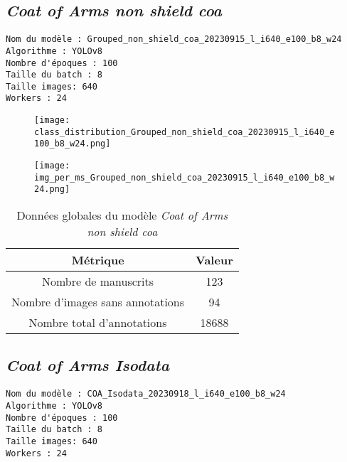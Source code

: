 \documentclass[12pt,twoside]{book}
\begin{document}
\newpage
\subsection{\textit{Coat of Arms non shield coa}}

\begin{verbatim}
Nom du modèle : Grouped_non_shield_coa_20230915_l_i640_e100_b8_w24
Algorithme : YOLOv8
Nombre d'époques : 100
Taille du batch : 8
Taille images: 640
Workers : 24
\end{verbatim}


\begin{figure}[ht]
    \centering
    \begin{minipage}[b]{0.45\textwidth}
        \centering
        \texttt{[image: class\_distribution\_Grouped\_non\_shield\_coa\_20230915\_l\_i640\_e100\_b8\_w24.png]}
    \end{minipage}
    \hfill
    \begin{minipage}[b]{0.45\textwidth}
        \centering
        \texttt{[image: img\_per\_ms\_Grouped\_non\_shield\_coa\_20230915\_l\_i640\_e100\_b8\_w24.png]}
    \end{minipage}
\end{figure}

\begin{center}
\begin{table}[ht]
    \centering
    \caption{Données globales du modèle \textit{Coat of Arms non shield coa}}
    \begin{tabular}{|c|c|}
    \hline
    \textbf{Métrique} & \textbf{Valeur} \\
    \hline
    Nombre de manuscrits & 123 \\ 
    \hline
    Nombre d'images sans annotations & 94 \\ 
    \hline
    Nombre total d'annotations & 18688 \\ 
    \hline
    \end{tabular}
\end{table}    
\end{center}

\newpage
\subsection{\textit{Coat of Arms Isodata}}

\begin{verbatim}
Nom du modèle : COA_Isodata_20230918_l_i640_e100_b8_w24
Algorithme : YOLOv8
Nombre d'époques : 100
Taille du batch : 8
Taille images: 640
Workers : 24
\end{verbatim}
\end{document}
